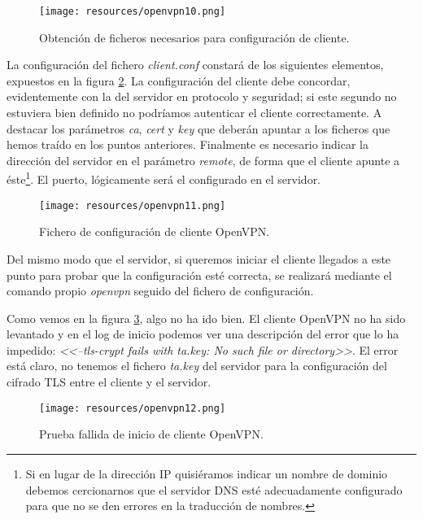 \documentclass[a4paper, 11pt, titlepage]{article}
\begin{document}
        \begin{figure}[htp]
            \centering
            \texttt{[image: resources/openvpn10.png]}
            \caption{Obtención de ficheros necesarios para configuración de cliente.}
            \label{}
        \end{figure}   

        La configuración del fichero \textit{client.conf} constará de los siguientes elementos,
        expuestos en la figura \ref{openvpn11}. La configuración del cliente debe concordar,
        evidentemente con la del servidor en protocolo y seguridad; si este segundo no estuviera
        bien definido no podríamos autenticar el cliente correctamente. A destacar los parámetros
        \textit{ca}, \textit{cert} y \textit{key} que deberán apuntar a los ficheros que hemos
        traído en los puntos anteriores. Finalmente es necesario indicar la dirección del servidor
        en el parámetro \textit{remote}, de forma que el cliente apunte a éste\footnote{
            Si en lugar de la dirección IP quisiéramos indicar un nombre de dominio debemos
            cercionarnos que el servidor DNS esté adecuadamente configurado para que no se 
            den errores en la traducción de nombres.
        }. El puerto, lógicamente será el configurado en el servidor.

        \begin{figure}[htp]
            \centering
            \texttt{[image: resources/openvpn11.png]}
            \caption{Fichero de configuración de cliente OpenVPN.}
            \label{openvpn11}
        \end{figure}   

        Del mismo modo que el servidor, si queremos iniciar el cliente llegados a este punto 
        para probar que la configuración esté correcta, se realizará mediante el comando propio
        \textit{openvpn} seguido del fichero de configuración.

        Como vemos en la figura \ref{openvpn12}, algo no ha ido bien. El cliente OpenVPN no 
        ha sido levantado y en el log de inicio podemos ver una descripción del error que lo ha 
        impedido: \textit{<<--tls-crypt fails with ta.key: No such file or directory>>}. El 
        error está claro, no tenemos el fichero \textit{ta.key} del servidor para la configuración
        del cifrado TLS entre el cliente y el servidor.

        \begin{figure}[htp]
            \centering
            \texttt{[image: resources/openvpn12.png]}
            \caption{Prueba fallida de inicio de cliente OpenVPN.}
            \label{openvpn12}
        \end{figure}   
\end{document}
